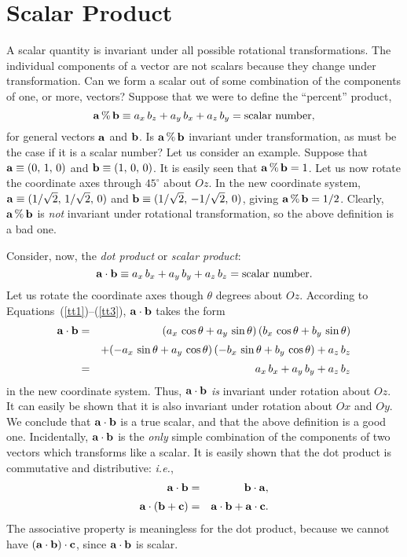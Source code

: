 \section{Scalar Product}
A scalar quantity is invariant under all possible rotational transformations.
The individual components of a vector are not scalars because they change under
transformation. Can we form a scalar out of some combination of the components
of one, or more, vectors? Suppose that we were to define the
``percent''  product,
\begin{equation}
{\bf a}\,\%\,{\bf b} \equiv a_x \,b_z + a_y \,b_x + a_z \,b_y = {\rm scalar~number},
\end{equation}
for general vectors ${\bf a}$ and ${\bf b}$. Is ${\bf a}\,\%\,{\bf b}$ 
invariant under transformation, as must be the case if it is a scalar number?
Let us consider an example. Suppose that ${\bf a} \equiv (0,\,1,\,0)$ and
${\bf b} \equiv (1,\,0,\,0)$. It is easily seen that ${\bf a}\,\%\,{\bf b}= 1$. Let
us now rotate the coordinate axes through $45^\circ$ about  $Oz$. In the new
coordinate system, ${\bf a} \equiv (1/\sqrt{2},\, 1/\sqrt{2},\, 0)$ and ${\bf b} \equiv (1/\sqrt{2},\,-
1/\sqrt{2},\, 0)$, giving ${\bf a}\,\%\,{\bf b} = 1/2$. Clearly, ${\bf a}\,\%\,{\bf b}$
is {\em not} invariant under rotational transformation, so 
the above definition is a bad one.

Consider, now, 
the {\em dot product}\/ or {\em scalar product}:
\begin{equation}
{\bf a} \cdot {\bf b} \equiv a_x \,b_x + a_y \,b_y + a_z \,b_z =  {\rm scalar~number}.
\end{equation}
Let us rotate the coordinate axes though $\theta$ degrees about $Oz$. According to
Equations~(\ref{tt1})--(\ref{tt3}),  ${\bf a} \cdot {\bf b}$ takes the form
\begin{eqnarray}
 {\bf a} \cdot {\bf b} &= &(a_x\, \cos\theta+a_y\,\sin\theta)\,(b_x\,\cos\theta + b_y\,\sin\theta)\nonumber\\[0.5ex]
&&+(-a_x\,\sin\theta + a_y\,\cos\theta)\,(-b_x\,\sin \theta + b_y\,\cos\theta)
+a_z\, b_z\nonumber\\[0.5ex]
&= &a_x\, b_x + a_y\, b_y + a_z\, b_z
\end{eqnarray}
in the new coordinate system.
Thus, 
${\bf a} \cdot {\bf b}$ {\em is}\/ invariant under rotation about $Oz$. It can easily
be shown that it is also invariant under rotation about $Ox$ and $Oy$.
We conclude that ${\bf a} \cdot {\bf b}$ is a true scalar, and that the above definition is
a good one. Incidentally, ${\bf a} \cdot {\bf b}$ is the {\em only}\/
simple  combination of
the components of two vectors which transforms like a scalar. It is easily
shown that the dot product  is commutative  and distributive: {\em i.e.},
\begin{eqnarray}
{\bf a} \cdot {\bf b} &=& {\bf b} \cdot {\bf a},\nonumber\\[0.5ex] 
{\bf a}\cdot({\bf b}+{\bf c}) &=& {\bf a} \cdot {\bf b} + {\bf a}\cdot {\bf c}.
\end{eqnarray}
The associative property is meaningless for the dot product, because we cannot
have $({\bf a}\cdot{\bf b}) \cdot{\bf c}$, since  ${\bf a}\cdot{\bf b}$ is scalar.

